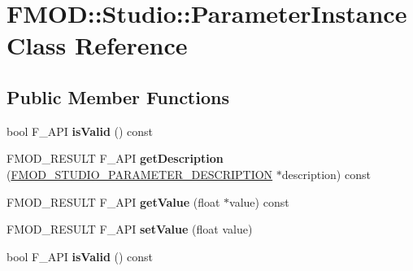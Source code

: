 \hypertarget{class_f_m_o_d_1_1_studio_1_1_parameter_instance}{\section{F\+M\+O\+D\+:\+:Studio\+:\+:Parameter\+Instance Class Reference}
\label{class_f_m_o_d_1_1_studio_1_1_parameter_instance}
}
\subsection*{Public Member Functions}
\begin{DoxyCompactItemize}
\item 
\hypertarget{class_f_m_o_d_1_1_studio_1_1_parameter_instance_a66f565a5090894f9236cdd14ca57fee9}{bool F\+\_\+\+A\+P\+I {\bfseries is\+Valid} () const }\label{class_f_m_o_d_1_1_studio_1_1_parameter_instance_a66f565a5090894f9236cdd14ca57fee9}

\item 
\hypertarget{class_f_m_o_d_1_1_studio_1_1_parameter_instance_a575014705d78764ec15343752c4f6569}{F\+M\+O\+D\+\_\+\+R\+E\+S\+U\+L\+T F\+\_\+\+A\+P\+I {\bfseries get\+Description} (\hyperlink{struct_f_m_o_d___s_t_u_d_i_o___p_a_r_a_m_e_t_e_r___d_e_s_c_r_i_p_t_i_o_n}{F\+M\+O\+D\+\_\+\+S\+T\+U\+D\+I\+O\+\_\+\+P\+A\+R\+A\+M\+E\+T\+E\+R\+\_\+\+D\+E\+S\+C\+R\+I\+P\+T\+I\+O\+N} $\ast$description) const }\label{class_f_m_o_d_1_1_studio_1_1_parameter_instance_a575014705d78764ec15343752c4f6569}

\item 
\hypertarget{class_f_m_o_d_1_1_studio_1_1_parameter_instance_a22d849cba1512aafc84e72d433966aef}{F\+M\+O\+D\+\_\+\+R\+E\+S\+U\+L\+T F\+\_\+\+A\+P\+I {\bfseries get\+Value} (float $\ast$value) const }\label{class_f_m_o_d_1_1_studio_1_1_parameter_instance_a22d849cba1512aafc84e72d433966aef}

\item 
\hypertarget{class_f_m_o_d_1_1_studio_1_1_parameter_instance_a64ba1c8131a3c3515b9b9f477615536d}{F\+M\+O\+D\+\_\+\+R\+E\+S\+U\+L\+T F\+\_\+\+A\+P\+I {\bfseries set\+Value} (float value)}\label{class_f_m_o_d_1_1_studio_1_1_parameter_instance_a64ba1c8131a3c3515b9b9f477615536d}

\item 
\hypertarget{class_f_m_o_d_1_1_studio_1_1_parameter_instance_a66f565a5090894f9236cdd14ca57fee9}{bool F\+\_\+\+A\+P\+I {\bfseries is\+Valid} () const }\label{class_f_m_o_d_1_1_studio_1_1_parameter_instance_a66f565a5090894f9236cdd14ca57fee9}


\end{DoxyCompactItemize}
